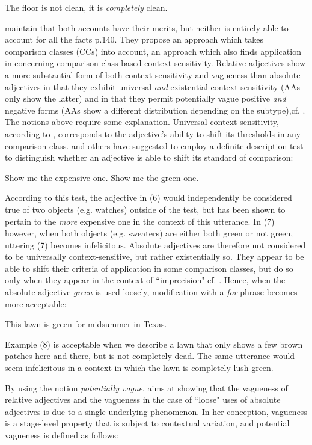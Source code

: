 \documentclass[output=paper
,modfonts
,nonflat]{langsci/langscibook}
\begin{document}
\ea
	The floor is not clean, it is \textit{completely} clean.
\z

\citet*{Toledo2011} maintain that both accounts have their merits, but neither is entirely able to account for all the facts p.140. They propose an approach which takes comparison classes (CCs) into account, an approach which also finds application in \citet{Burnett2017} concerning comparison-class based context sensitivity.
Relative adjectives show a more substantial form of both context-sensitivity and vagueness than absolute adjectives in that they exhibit universal \textit{and} existential context-sensitivity (AAs only show the latter) and in that they permit potentially vague positive \textit{and} negative forms (AAs show a different distribution depending on the subtype),cf. \citet{Burnett2017}. The notions above require some explanation. Universal context-sensitivity, according to \textcite[41]{Burnett2017}, corresponds to the adjective's ability to shift its thresholds in any comparison class. \textcite[28]{Kennedy2007} and others have suggested to employ a definite description test to distinguish whether an adjective is able to shift its standard of comparison:

\ea
	Show me the expensive one.
\z
\ea
	Show me the green one.
\z

According to this test, the adjective in (6) would independently be considered true of two objects (e.g. watches) outside of the test, but has been shown to pertain to the \textit{more} expensive one in the context of this utterance. In (7) however, when both objects (e.g. sweaters) are either both green or not green, uttering (7) becomes infelicitous. Absolute adjectives are therefore not considered to be universally context-sensitive, but rather existentially so. They appear to be able to shift their criteria of application in some comparison classes, but do so only when they appear in the context of ``imprecision" cf. \textcite[42]{Burnett2017}. Hence, when the absolute adjective \textit{green} is used loosely, modification with a \textit{for}-phrase becomes more acceptable:

\ea
	This lawn is green for midsummer in Texas.
\z

Example (8) is acceptable when we describe a lawn that only shows a few brown patches here and there, but is not completely dead. The same utterance would seem infelicitous in a context in which the lawn is completely lush green.

By using the notion \textit{potentially vague}, \textcite[49]{Burnett2017} aims at showing that the vagueness of relative adjectives and the vagueness in the case of ``loose" uses of absolute adjectives is due to a single underlying phenomenon. In her conception, vagueness is a stage-level property that is subject to contextual variation, and potential vagueness is defined as follows:
\end{document}
